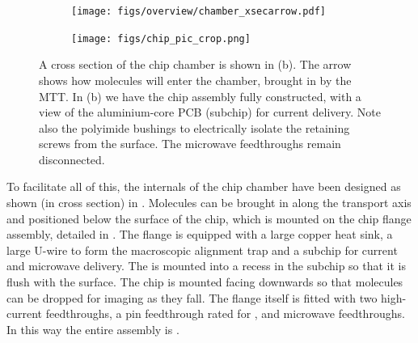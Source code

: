\begin{figure}
  \centering
  \begin{subfigure}[b]{0.45\textwidth}
    \texttt{[image: figs/overview/chamber\_xsecarrow.pdf]}
    \caption{}
  \end{subfigure}
  \hspace{1cm}
  \begin{subfigure}[b]{0.45\textwidth}
    \texttt{[image: figs/chip\_pic\_crop.png]}
    \caption{}
  \end{subfigure}
  A cross section of the chip chamber is shown in (b). The arrow shows how
  molecules will enter the chamber, brought in by the MTT.
  In (b) we have the chip assembly fully constructed, with a view of the
    aluminium-core PCB (subchip) for current delivery. Note also the polyimide
    bushings to electrically isolate the retaining screws from the surface. The
    microwave feedthroughs remain disconnected.
\end{figure}


To facilitate all of this, the internals of the chip chamber have been designed
as shown (in cross section) in . Molecules can be brought in along the
transport axis and positioned below the surface of the chip, which is mounted
on the chip flange assembly, detailed in .
The flange is equipped with a large copper heat sink, a large U-wire to form
the macroscopic alignment trap and a subchip for current and microwave
delivery. The  is mounted into a recess in the subchip so that
it is flush with the surface. The chip is mounted facing downwards so that
molecules can be dropped for imaging as they fall. The flange itself is fitted
with two high-current feedthroughs, a  pin feedthrough rated for
, and microwave feedthroughs. In this way the entire assembly 
is .
